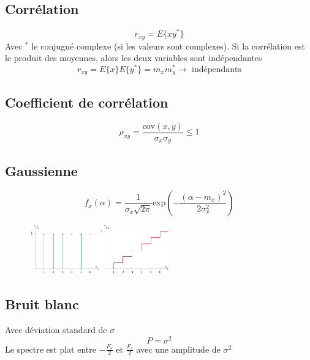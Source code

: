 \documentclass[resume]{subfiles}
\begin{document}
\subsection{Corrélation}
$$r_{xy}=E\lbrace xy^\ast\rbrace$$
Avec ${}^\ast$ le conjugué complexe (si les valeurs sont complexes). Si la corrélation est le produit des moyennes, alors les deux variables sont indépendantes
$$r_{xy}=E\lbrace x\rbrace E\lbrace y^\ast\rbrace=m_xm_y^\ast\longrightarrow\text{ indépendants}$$
\subsection{Coefficient de corrélation}
$$\rho_{xy}=\frac{\text{cov}(x,y)}{\sigma_x\sigma_y}\leq 1$$
\subsection{Gaussienne}
$$f_x(\alpha)=\frac{1}{\sigma_x\sqrt{2\pi}}\text{exp}\left(-\frac{(\alpha-m_x)^2}{2\sigma_x^2}\right)$$
\begin{figure}[H]
\centering
\includegraphics[width=6cm ,page=3]{drwg_3.pdf}
\end{figure}
\subsection{Bruit blanc}
Avec déviation standard de $\sigma$
$$P=\sigma^2$$
Le spectre est plat entre $-\frac{F_s}{2}$ et $\frac{F_s}{2}$ avec une amplitude de $\sigma^2$
\end{document}
